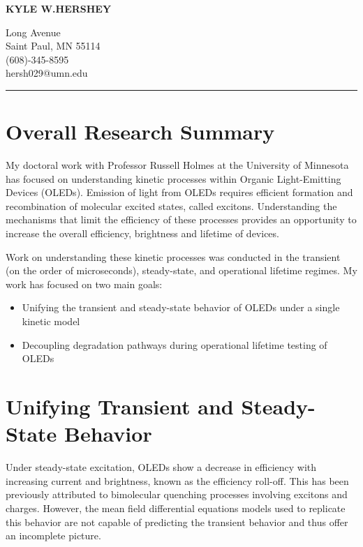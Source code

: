 \documentclass[a4paper,titlepage]{article}
\begin{document}
\Huge \noindent \textbf{KYLE W.HERSHEY} \hfill 
\footnotesize \parbox[b]{2in}{\begingroup {} Long Avenue\\Saint Paul, MN 55114\\(608)-345-8595\\hersh029@umn.edu \par \endgroup}
\normalsize
\vspace{1ex}
\hrule

\section*{Overall Research Summary}
My doctoral work with Professor Russell Holmes at the University of Minnesota has focused on understanding kinetic processes within Organic Light-Emitting Devices (OLEDs).
Emission of light from OLEDs requires efficient formation and recombination of molecular excited states, called excitons.
Understanding the mechanisms that limit the efficiency of these processes provides an opportunity to increase the overall efficiency, brightness and lifetime of devices.


Work on understanding these kinetic processes was conducted in the transient  (on the order of microseconds), steady-state, and operational lifetime regimes.
My work has focused on two main goals:

\begin{itemize}
\vspace{-1.5ex}
\item Unifying the transient and steady-state behavior of OLEDs under a single kinetic model
\vspace{-1.5ex}
\item Decoupling degradation pathways during operational lifetime testing of OLEDs
\end{itemize}


\vspace{-2ex}
\section*{Unifying Transient and Steady-State Behavior}

Under steady-state excitation, OLEDs show a decrease in efficiency with increasing current and brightness, known as the efficiency roll-off.
This has been previously attributed to bimolecular quenching processes involving excitons and charges.
However, the mean field differential equations models used to replicate this behavior are not capable of predicting the transient behavior and thus offer an incomplete picture.
  
\end{document}
